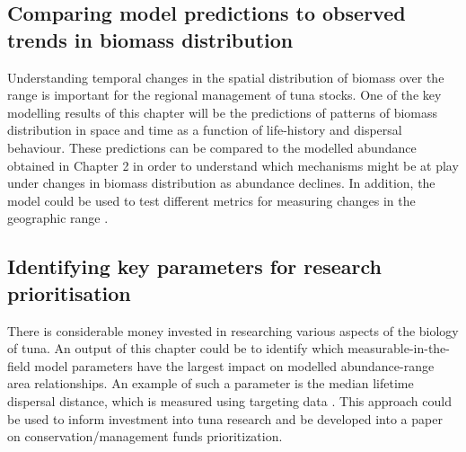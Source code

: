 \documentclass{article}
\begin{document}
\subsection{Comparing model predictions to observed trends in
  biomass distribution}

Understanding temporal changes in the spatial distribution of biomass
over the range is important for the regional management of
tuna stocks. One of the key modelling results of this chapter will be
the predictions of patterns of biomass distribution in space
and time as a function of life-history and dispersal behaviour. These
predictions can be compared to the modelled abundance obtained in
Chapter 2 in order to understand which mechanisms might be at
play under changes in biomass distribution as abundance declines. In
addition, the model could be used to test different metrics for
measuring changes in the geographic range \citep[for example CPUE
thresholds as done in Chapter 2, and other methods advocated
in][]{Swain1994_a}.

\subsection{Identifying key parameters for research prioritisation}

There is considerable money invested in researching various aspects
of the biology of tuna. An output of this chapter could be to
identify which measurable-in-the-field model parameters have the
largest impact on modelled abundance-range area
relationships. An example of such a parameter is the median lifetime
dispersal distance, which is measured using targeting data
\citep[see for e.g.][]{Sibert2003_a}. This approach could be used to
inform investment into tuna research and be developed into a paper on
conservation/management funds prioritization.





\end{document}
